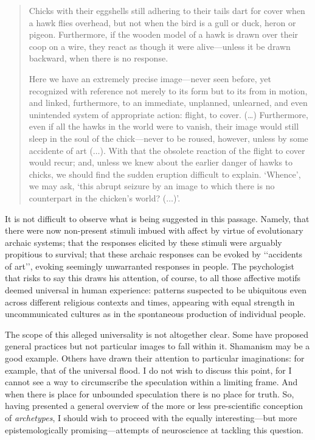 \documentclass[a4paper]{article}
\begin{document}
    \begin{quote}
        Chicks with their eggshells still adhering to their tails dart for
        cover when a hawk flies overhead, but not when the bird is a gull or
        duck, heron or pigeon. Furthermore, if the wooden model of a hawk is
        drawn over their coop on a wire, they react as though it were
        alive---unless it be drawn backward, when there is no response.

        Here we have an extremely precise image---never seen before, yet
        recognized with reference not merely to its form but to its from in
        motion, and linked, furthermore, to an immediate, unplanned, unlearned,
        and even unintended system of appropriate action: flight, to cover.
        (\ldots) Furthermore, even if all the hawks in the world were to
        vanish, their image would still sleep in the soul of the chick---never
        to be roused, however, unless by some accidente of art ($\ldots$). With
        that the obsolete reaction of the flight to cover would recur; and,
        unless we knew about the earlier danger of hawks to chicks, we should
        find the sudden eruption difficult to explain. \lq Whence\rq, we may
        ask, \lq this abrupt seizure by an image to which there is no
        counterpart in the chicken's world? ($\ldots$)\rq.
    \end{quote}

    It is not difficult to observe what is being suggested in this passage.
    Namely, that there were now non-present stimuli imbued with affect by
    virtue of evolutionary archaic systems; that the responses elicited by
    these stimuli were arguably propitious to survival; that these archaic
    responses can be evoked by \lq\lq accidents of art\rq\rq, evoking seemingly
    unwarranted responses in people. The psychologist that risks to say this
    draws his attention, of course, to all those affective motifs deemed
    universal in human experience: patterns suspected to be ubiquitous even
    across different religious contexts and times, appearing with equal
    strength in uncommunicated cultures as in the spontaneous production of
    individual people. 

    The scope of this alleged universality is not altogether clear. Some have
    proposed general practices but not particular images to fall within it.
    Shamanism may be a good example. Others have drawn their attention to
    particular imaginations: for example, that of the universal flood. I do not
    wish to discuss this point, for I cannot see a way to circumscribe the
    speculation within a limiting frame. And when there is place for unbounded
    speculation there is no place for truth. So, having presented a general
    overview of the more or less pre-scientific conception of
    \textit{archetypes}, I should wish to proceed with the equally
    interesting---but more epistemologically promising---attempts of
    neuroscience at tackling this question.
\end{document}
